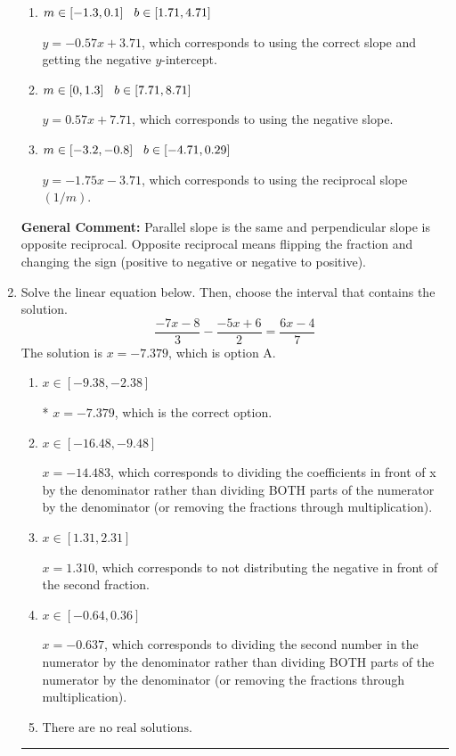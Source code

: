 \documentclass{extbook}[14pt]
\newcommand{\litem}[1]{\item #1

\rule{\textwidth}{0.4pt}}
\begin{document}
\begin{enumerate}
{\begin{enumerate}[label=\Alph*.]
* $y = -0.57x - 3.71$, which is the correct option.
\item \( m \in [-1.3, 0.1] \hspace*{3mm} b \in [1.71, 4.71] \)

 $y = -0.57x + 3.71$, which corresponds to using the correct slope and getting the negative $y$-intercept.
\item \( m \in [0, 1.3] \hspace*{3mm} b \in [7.71, 8.71] \)

 $y = 0.57x + 7.71$, which corresponds to using the negative slope.
\item \( m \in [-3.2, -0.8] \hspace*{3mm} b \in [-4.71, 0.29] \)

 $y = -1.75x - 3.71$, which corresponds to using the reciprocal slope $(1/m)$.
\end{enumerate}

\textbf{General Comment:} Parallel slope is the same and perpendicular slope is opposite reciprocal. Opposite reciprocal means flipping the fraction and changing the sign (positive to negative or negative to positive).
}
\litem{
Solve the linear equation below. Then, choose the interval that contains the solution.
\[ \frac{-7x -8}{3} - \frac{-5x + 6}{2} = \frac{6x -4}{7} \]
The solution is \( x = -7.379 \), which is option A.\begin{enumerate}[label=\Alph*.]
\item \( x \in [-9.38, -2.38] \)

* $x = -7.379$, which is the correct option.
\item \( x \in [-16.48, -9.48] \)

 $x = -14.483$, which corresponds to dividing the coefficients in front of x by the denominator rather than dividing BOTH parts of the numerator by the denominator (or removing the fractions through multiplication).
\item \( x \in [1.31, 2.31] \)

 $x = 1.310$, which corresponds to not distributing the negative in front of the second fraction.
\item \( x \in [-0.64, 0.36] \)

 $x = -0.637$, which corresponds to dividing the second number in the numerator by the denominator rather than dividing BOTH parts of the numerator by the denominator (or removing the fractions through multiplication).
\item \( \text{There are no real solutions.} \)


\end{enumerate}}
\end{enumerate}
\end{document}
